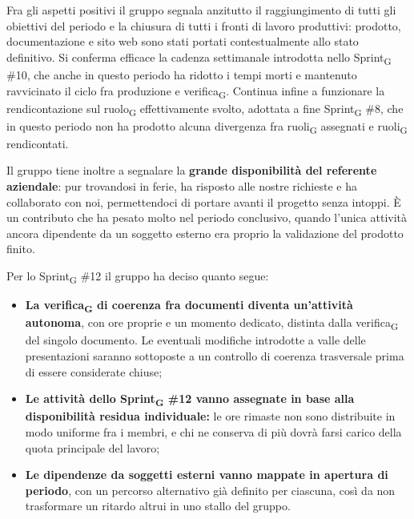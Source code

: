 ﻿\documentclass[a4paper, 10pt, colorlinks=true, linkcolor=black, urlcolor=blue, citecolor=blue, hidelinks]{article}
\begin{document}
Fra gli aspetti positivi il gruppo segnala anzitutto il raggiungimento di tutti gli obiettivi del periodo e la chiusura di tutti i fronti di lavoro produttivi: prodotto, documentazione e sito web sono stati portati contestualmente allo stato definitivo. Si conferma efficace la cadenza settimanale introdotta nello Sprint\textsubscript{G} \#10, che anche in questo periodo ha ridotto i tempi morti e mantenuto ravvicinato il ciclo fra produzione e verifica\textsubscript{G}. Continua infine a funzionare la rendicontazione sul ruolo\textsubscript{G} effettivamente svolto, adottata a fine Sprint\textsubscript{G} \#8, che in questo periodo non ha prodotto alcuna divergenza fra ruoli\textsubscript{G} assegnati e ruoli\textsubscript{G} rendicontati.

Il gruppo tiene inoltre a segnalare la \textbf{grande disponibilità del referente aziendale}: pur trovandosi in ferie, ha risposto alle nostre richieste e ha collaborato con noi, permettendoci di portare avanti il progetto senza intoppi. È un contributo che ha pesato molto nel periodo conclusivo, quando l'unica attività ancora dipendente da un soggetto esterno era proprio la validazione del prodotto finito.

Per lo Sprint\textsubscript{G} \#12 il gruppo ha deciso quanto segue:
\begin{itemize}
    \item \textbf{La verifica\textsubscript{G} di coerenza fra documenti diventa un'attività autonoma}, con ore proprie e un momento dedicato, distinta dalla verifica\textsubscript{G} del singolo documento. Le eventuali modifiche introdotte a valle delle presentazioni saranno sottoposte a un controllo di coerenza trasversale prima di essere considerate chiuse;

    \item \textbf{Le attività dello Sprint\textsubscript{G} \#12 vanno assegnate in base alla disponibilità residua individuale:} le ore rimaste non sono distribuite in modo uniforme fra i membri, e chi ne conserva di più dovrà farsi carico della quota principale del lavoro;

    \item \textbf{Le dipendenze da soggetti esterni vanno mappate in apertura di periodo}, con un percorso alternativo già definito per ciascuna, così da non trasformare un ritardo altrui in uno stallo del gruppo.
\end{itemize}
\end{document}
